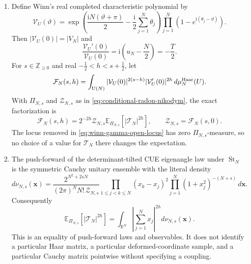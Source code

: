 \begin{theorem}
\begin{enumerate}
 \item Define Winn's real completed characteristic polynomial by
 \begin{equation}
  \mathcal V_U(\vartheta)=
  \exp\!\left(\frac{\mathrm iN(\vartheta+\pi)}2
  -\frac{\mathrm i}{2}\sum_{j=1}^{N}\theta_j\right)
  \prod_{j=1}^{N}\left(1-e^{\mathrm i(\theta_j-\vartheta)}\right).
  \label{eq:winn-completed-characteristic-polynomial}
 \end{equation}
 Then $|\mathcal V_U(0)|=|V_N|$ and
 \begin{equation}
  \frac{\mathcal V_U'(0)}{\mathcal V_U(0)}
  =\mathrm i\left(u_N-\frac N2\right)=-\frac T2.
  \label{eq:winn-completed-log-derivative}
 \end{equation}
 For $s\in\mathbb Z_{\geq0}$ and real
 $-\tfrac12<h<s+\tfrac12$, let
 \begin{equation}
  \mathcal F_N(s,h)=
  \int_{\mathrm U(N)}|\mathcal V_U(0)|^{2(s-h)}
  |\mathcal V_U'(0)|^{2h}\,d\mu_N^{\rm Haar}(U).
  \label{eq:winn-joint-moment-definition}
 \end{equation}
 With $\Pi_{N,s}$ and $\mathcal Z_{N,s}$ as in
 \eqref{eq:conditional-radon-nikodym}, the exact factorization is
 \begin{equation}
  \mathcal F_N(s,h)
  =2^{-2h}\mathcal Z_{N,s}
  \mathbb E_{\Pi_{N,s}}\!\left[|\mathcal T_N|^{2h}\right],
  \qquad
  \mathcal Z_{N,s}=\mathcal F_N(s,0).
  \label{eq:winn-moment-gamma-tilt}
 \end{equation}
 The locus removed in \eqref{eq:winn-gamma-open-locus} has zero
 $\Pi_{N,s}$-measure, so no choice of a value for $\mathcal T_N$ there changes the
 expectation.

 \item The push-forward of the determinant-tilted CUE eigenangle law under
 $\operatorname{St}_N$ is the symmetric Cauchy unitary ensemble with the literal
 density
 \begin{equation}
  d\nu_{N,s}(\mathbf x)
  =\frac{2^{N^2+2sN}}
  {(2\pi)^N N!\,\mathcal Z_{N,s}}
  \prod_{1\leq j<k\leq N}(x_k-x_j)^2
  \prod_{j=1}^{N}(1+x_j^2)^{-(N+s)}\,d\mathbf x.
  \label{eq:winn-cauchy-density-exact}
 \end{equation}
 Consequently
 \begin{equation}
  \mathbb E_{\Pi_{N,s}}[|\mathcal T_N|^{2h}]
  =\int_{\mathbb R^N}\left|\sum_{j=1}^{N}x_j\right|^{2h}
  d\nu_{N,s}(\mathbf x).
  \label{eq:winn-cauchy-trace-pushforward}
 \end{equation}
 This is an equality of push-forward laws and observables.  It does not identify a
 particular Haar matrix, a particular deformed-coordinate sample, and a particular
 Cauchy matrix pointwise without specifying a coupling.
\end{enumerate}
\end{theorem}

